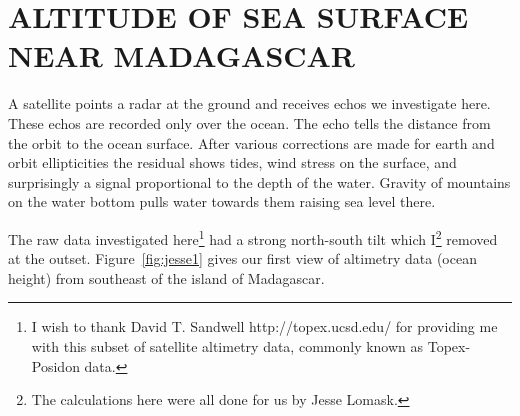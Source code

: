 \begin{comment}
\par
Finally, subroutine \texttt{seastat()} builds a topographic map
from satellite data tracks;
the subroutine uses either of two different statistical assumptions.
The first assumption is that the 2-D prediction-error filter (PEF)
for the topography is Laplace's operator.
The alternate assumption is that a previous map is available
which can be used by \texttt{pef2()} \vpageref{/prog:pef2} to compute the required PEF.
The previous map is presumed to be poor where the tracks are missing.
To put this presumption into practice, we set
the map to zero where there are no data tracks,
so {\tt pef2()} will handle such regions as missing data.
Then we define the template of free parameters with subroutine \texttt{setfree()} \vpageref{/prog:setfree};
and we call subroutine \texttt{pef2()} \vpageref{/prog:pef2} to get the PEF.
With the inputs now all prepared, we invoke subroutine \texttt{seatopo()}.
\progdex{seastat}{topog. statistics}

\end{comment}







\section{ALTITUDE OF SEA SURFACE NEAR MADAGASCAR}


\par
A satellite points a radar at the ground and
receives echos we investigate here.
These echos are recorded only over the ocean.
The echo tells the distance from the orbit to the ocean surface.
After various corrections are made for earth and orbit ellipticities
the residual shows tides, wind stress on the surface,
and surprisingly a signal proportional to the depth of the water.
Gravity of mountains on the water bottom pulls water towards them
raising sea level there.

\par
The raw data investigated here\footnote{
	I wish to thank David T. Sandwell
	http://topex.ucsd.edu/
	for providing me with this subset of satellite altimetry data,
	commonly known as Topex-Posidon data.
	}
had a strong north-south tilt
which I\footnote{
	The calculations here were
	all done for us by Jesse Lomask.
	}
removed at the outset.
Figure~\ref{fig:jesse1} gives our first view of altimetry data
(ocean height) from southeast of the island of
Madagascar.

